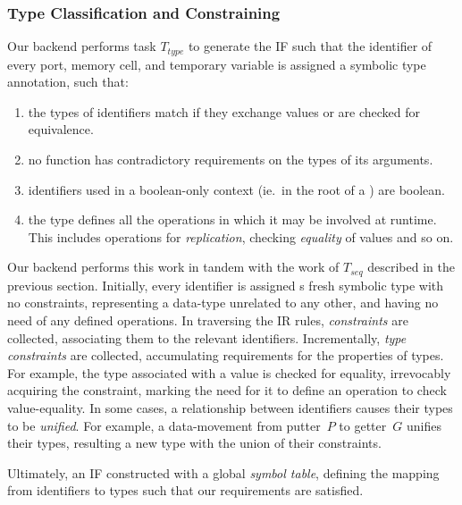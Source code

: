 \subsubsection{Type Classification and Constraining}
Our backend performs task $T_{type}$ to generate the IF such that the identifier of every port, memory cell, and temporary variable is assigned a symbolic type annotation, such that:
\begin{enumerate}
	\item the types of identifiers match if they exchange values or are checked for equivalence.
	\item no function has contradictory requirements on the types of its arguments.
	\item identifiers used in a boolean-only context (ie.\ in the root of a ) are boolean.
	\item the type defines all the operations in which it may be involved at runtime. This includes operations for \textit{replication}, checking \textit{equality} of values and so on.
\end{enumerate}

Our backend performs this work in tandem with the work of $T_{seq}$ described in the previous section. Initially, every identifier is assigned s fresh symbolic type with no constraints, representing a data-type unrelated to any other, and having no need of any defined operations. In traversing the IR rules, \textit{constraints} are collected, associating them to the relevant identifiers. Incrementally, \textit{type constraints} are collected, accumulating requirements for the properties of types. For example, the type associated with a value is checked for equality, irrevocably acquiring the  constraint, marking the need for it to define an operation to check value-equality. In some cases, a relationship between identifiers causes their types to be \textit{unified}. For example, a data-movement from putter~$P$ to getter~$G$ unifies their types, resulting a new type with the union of their constraints.

Ultimately, an IF constructed with a global \textit{symbol table}, defining the mapping from identifiers to types such that our requirements are satisfied.

